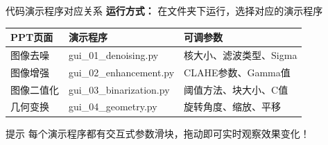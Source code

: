 \documentclass[aspectratio=169, 10pt]{beamer}
\begin{document}
\begin{frame}{代码演示程序对应关系}
    \textbf{运行方式：} 在文件夹下运行，选择对应的演示程序

    \vspace{0.3cm}

    \begin{table}
        \centering
        \small
        \begin{tabular}{lp{5cm}l}
            \toprule
            \textbf{PPT页面} & \textbf{演示程序} & \textbf{可调参数} \\
            \midrule
            图像去噪 & gui\_01\_denoising.py & 核大小、滤波类型、Sigma \\
            图像增强 & gui\_02\_enhancement.py & CLAHE参数、Gamma值 \\
            图像二值化 & gui\_03\_binarization.py & 阈值方法、块大小、C值 \\
            几何变换 & gui\_04\_geometry.py & 旋转角度、缩放、平移 \\
            \bottomrule
        \end{tabular}
    \end{table}

    \vspace{0.3cm}

    \begin{alertblock}{提示}
        每个演示程序都有交互式参数滑块，拖动即可实时观察效果变化！
    \end{alertblock}
\end{frame}










\end{document}
